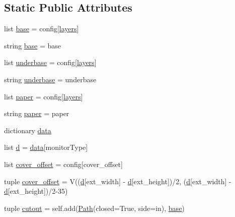 \subsection*{Static Public Attributes}
\begin{DoxyCompactItemize}
\item 
list \hyperlink{classparts_1_1_flat_monitor_a5b12e95057e3b393ec757287d34117d4}{base} = config\mbox{[}\textquotesingle{}\hyperlink{classpath_1_1_part_adcfeed4d6166f35e3ea1eb87926f6a5e}{layers}\textquotesingle{}\mbox{]}
\item 
string \hyperlink{classparts_1_1_flat_monitor_a39d2920a0ecf49aa777c8e6a882cf137}{base} = \textquotesingle{}base\textquotesingle{}
\item 
list \hyperlink{classparts_1_1_flat_monitor_a5c9d47de6a4736f41a4e4364948295cb}{underbase} = config\mbox{[}\textquotesingle{}\hyperlink{classpath_1_1_part_adcfeed4d6166f35e3ea1eb87926f6a5e}{layers}\textquotesingle{}\mbox{]}
\item 
string \hyperlink{classparts_1_1_flat_monitor_aabfe77e5bd4348b9878651bb8c27338b}{underbase} = \textquotesingle{}underbase\textquotesingle{}
\item 
list \hyperlink{classparts_1_1_flat_monitor_a7d9c9c12ad6f9aa631e1311fc0d3fa94}{paper} = config\mbox{[}\textquotesingle{}\hyperlink{classpath_1_1_part_adcfeed4d6166f35e3ea1eb87926f6a5e}{layers}\textquotesingle{}\mbox{]}
\item 
string \hyperlink{classparts_1_1_flat_monitor_a06549e5fe9a98b11e78c86b1c7c42ce5}{paper} = \textquotesingle{}paper\textquotesingle{}
\item 
dictionary \hyperlink{classparts_1_1_flat_monitor_a235b01403ad3bb1c5d95d6cbc08dac96}{data}
\item 
list \hyperlink{classparts_1_1_flat_monitor_aeb1da09bd78cfac34f42ed8dabe0c386}{d} = \hyperlink{classparts_1_1_flat_monitor_a235b01403ad3bb1c5d95d6cbc08dac96}{data}\mbox{[}monitor\+Type\mbox{]}
\item 
list \hyperlink{classparts_1_1_flat_monitor_a301f413ff58034dd8afd5c9771a59edf}{cover\+\_\+offset} = config\mbox{[}\textquotesingle{}cover\+\_\+offset\textquotesingle{}\mbox{]}
\item 
tuple \hyperlink{classparts_1_1_flat_monitor_a070aab76902eac0b8335e2f68e0c8241}{cover\+\_\+offset} = V((\hyperlink{classparts_1_1_flat_monitor_aeb1da09bd78cfac34f42ed8dabe0c386}{d}\mbox{[}\textquotesingle{}ext\+\_\+width\textquotesingle{}\mbox{]} -\/ \hyperlink{classparts_1_1_flat_monitor_aeb1da09bd78cfac34f42ed8dabe0c386}{d}\mbox{[}\textquotesingle{}ext\+\_\+height\textquotesingle{}\mbox{]})/2, (\hyperlink{classparts_1_1_flat_monitor_aeb1da09bd78cfac34f42ed8dabe0c386}{d}\mbox{[}\textquotesingle{}ext\+\_\+width\textquotesingle{}\mbox{]} -\/ \hyperlink{classparts_1_1_flat_monitor_aeb1da09bd78cfac34f42ed8dabe0c386}{d}\mbox{[}\textquotesingle{}ext\+\_\+height\textquotesingle{}\mbox{]})/2-\/35)
\item 
tuple \hyperlink{classparts_1_1_flat_monitor_a32ee97ffa1cbb8196a5341c2864dbddb}{cutout} = self.\+add(\hyperlink{classpath_1_1_path}{Path}(closed=True, side=\textquotesingle{}in\textquotesingle{}), \hyperlink{classparts_1_1_flat_monitor_a5b12e95057e3b393ec757287d34117d4}{base})
\end{DoxyCompactItemize}
